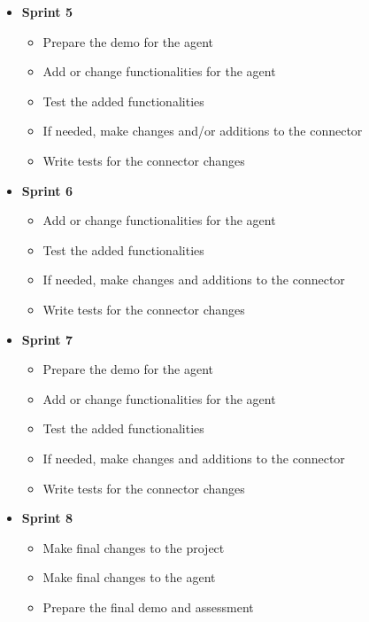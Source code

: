 \begin{itemize}
\item\textbf{Sprint 5}

\begin{itemize}
  \item Prepare the demo for the agent
  \item Add or change functionalities for the agent
  \item Test the added functionalities
  \item If needed, make changes and/or additions to the connector
  \item Write tests for the connector changes
\end{itemize}


\item\textbf{Sprint 6}

\begin{itemize}
  \item Add or change functionalities for the agent
  \item Test the added functionalities
  \item If needed, make changes and additions to the connector
  \item Write tests for the connector changes
\end{itemize}


\item\textbf{Sprint 7}

\begin{itemize}
  \item Prepare the demo for the agent
  \item Add or change functionalities for the agent
  \item Test the added functionalities
  \item If needed, make changes and additions to the connector
  \item Write tests for the connector changes
\end{itemize}

\newpage
\item\textbf{Sprint 8}
\begin{itemize}
  \item Make final changes to the project
  \item Make final changes to the agent
  \item Prepare the final demo and assessment
\end{itemize}
\end{itemize}


